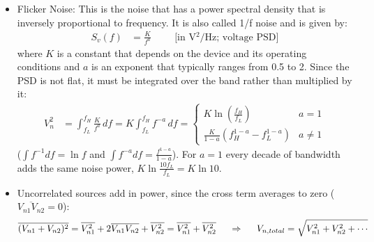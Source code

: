 \begin{itemize}
\begin{align*}
      I_n &= \sqrt{2 q I (f_H - f_L)} \hspace{1cm} \text{[in A\(_{\text{rms}}\)]}
    \end{align*}
    where \(q\) is the charge of an electron and \(I\) is the average current
    in amperes.
  \item Flicker Noise: This is the noise that has a power spectral density that
    is inversely proportional to frequency. It is also called 1/f noise and
    is given by:
    \begin{align*}
      S_v(f) &= \frac{K}{f^a} \hspace{1cm} \text{[in V\(^2\)/Hz; voltage PSD]}
    \end{align*}
    where \(K\) is a constant that depends on the device and its operating
    conditions and \(a\) is an exponent that typically ranges from 0.5 to 2.
    Since the PSD is not flat, it must be integrated over the band rather
    than multiplied by it:
    \begin{align*}
      V_n^2 &= \int_{f_L}^{f_H} \frac{K}{f^a} \, df = K\int_{f_L}^{f_H} f^{-a} \, df =
      \begin{cases}
        K \ln\left(\frac{f_H}{f_L}\right) & a = 1 \\[2mm]
        \frac{K}{1 - a}\left(f_H^{1-a} - f_L^{1-a}\right) & a \neq 1
      \end{cases}
    \end{align*}
    (\(\int f^{-1} df = \ln f\) and \(\int f^{-a} df = \frac{f^{1-a}}{1-a}\)).
    For \(a = 1\) every decade of bandwidth adds the same noise power,
    \(K \ln\frac{10 f_L}{f_L} = K \ln 10\).
  \item Uncorrelated sources add in power, since the cross term averages to
    zero (\(\overline{V_{n1}V_{n2}} = 0\)):
    \begin{align*}
      \overline{(V_{n1} + V_{n2})^2} = \overline{V_{n1}^2} + 2\overline{V_{n1}V_{n2}} + \overline{V_{n2}^2} = \overline{V_{n1}^2} + \overline{V_{n2}^2}
      \hspace{0.5cm} \Rightarrow \hspace{0.5cm}
      V_{n,total} = \sqrt{V_{n1}^2 + V_{n2}^2 + \cdots}
    \end{align*}
\end{itemize}

